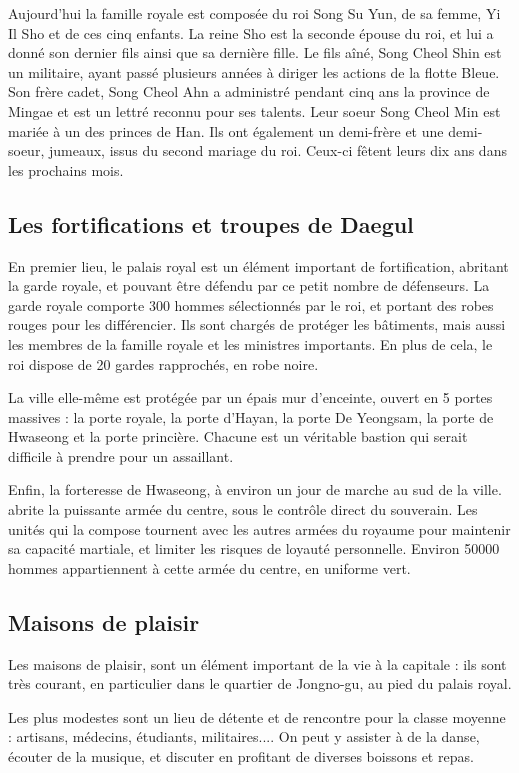 \documentclass[10pt,a4paper]{book}
\begin{document}
Aujourd'hui la famille royale est composée du roi Song Su Yun, de sa femme, Yi Il Sho et de ces cinq enfants. La reine Sho est la seconde épouse du roi, et lui a donné son dernier fils ainsi que sa dernière fille. Le fils aîné, Song Cheol Shin  est un militaire, ayant passé plusieurs années à diriger les actions de la flotte Bleue. Son frère cadet, Song Cheol Ahn a administré pendant cinq ans la province de Mingae et est un lettré reconnu pour ses talents. Leur soeur Song Cheol Min est mariée à un des princes de Han. Ils ont également un demi-frère et une demi-soeur, jumeaux, issus du second mariage du roi. Ceux-ci fêtent leurs dix ans dans les prochains mois.
\subsection{Les fortifications et troupes de Daegul}
En premier lieu, le palais royal est un élément important de fortification, abritant la garde royale, et pouvant être défendu par ce petit nombre de défenseurs. La garde royale comporte 300 hommes sélectionnés par le roi, et portant des robes rouges pour les différencier. Ils sont chargés de protéger les bâtiments, mais aussi les membres de la famille royale et les ministres importants. En plus de cela, le roi dispose de 20 gardes rapprochés, en robe noire.

La ville elle-même est protégée par un épais mur d'enceinte, ouvert en 5 portes massives : la porte royale, la porte d'Hayan, la porte De Yeongsam, la porte de Hwaseong et la porte princière. Chacune est un véritable bastion qui serait difficile à prendre pour un assaillant.

Enfin, la forteresse de Hwaseong, à environ un jour de marche au sud de la ville. abrite la puissante armée du centre, sous le contrôle direct du souverain. Les unités qui la compose tournent avec les autres armées du royaume pour maintenir sa capacité martiale, et limiter les risques de loyauté personnelle. Environ 50000 hommes appartiennent à cette armée du centre, en uniforme vert.
\subsection{Maisons de plaisir}
Les maisons de plaisir, sont un élément important de la vie à la capitale : ils sont très courant, en particulier dans le quartier de Jongno-gu, au pied du palais royal. 

Les plus modestes sont un lieu de détente et de rencontre pour la classe moyenne : artisans, médecins, étudiants, militaires.... On peut y assister à de la danse, écouter de la musique, et discuter en profitant de diverses boissons et repas. 
\end{document}
